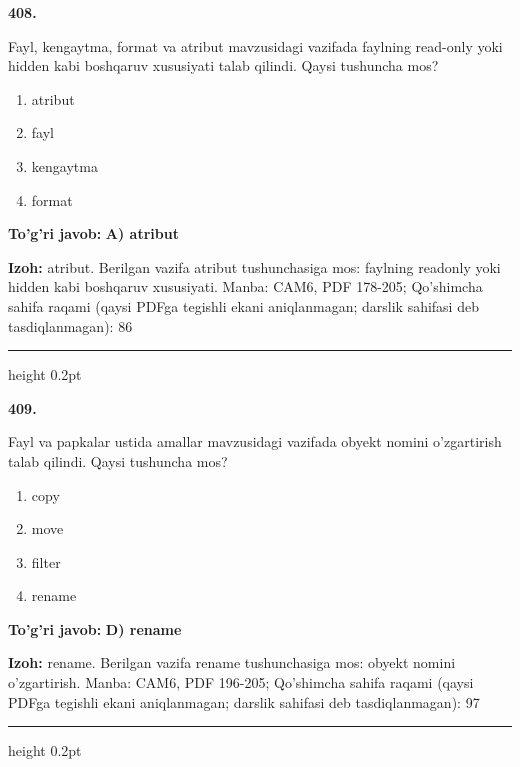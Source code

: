 \documentclass[10pt,a4paper]{article}
\begin{document}
{\bfseries\sffamily\color{ink} 408.}
\par
Fayl, kengaytma, format va atribut mavzusidagi vazifada faylning read-only yoki hidden kabi boshqaruv xususiyati talab qilindi. Qaysi tushuncha mos?
\begin{enumerate}[label=\Alph*),leftmargin=9mm]
\item atribut
\item fayl
\item kengaytma
\item format
\end{enumerate}
\begin{tcolorbox}[enhanced,breakable,colback=teal!4,colframe=teal!60!black,boxrule=0.45pt,arc=1.2mm,left=2.7mm,right=2.7mm,top=1.8mm,bottom=1.8mm,before skip=2mm,after skip=2mm]
{\bfseries\sffamily\color{teal}To'g'ri javob:} \textbf{A) atribut}
\par\smallskip
{\bfseries Izoh:} atribut. Berilgan vazifa atribut tushunchasiga mos: faylning readonly yoki hidden kabi boshqaruv xususiyati. Manba: CAM6, PDF 178-205; Qo'shimcha sahifa raqami (qaysi PDFga tegishli ekani aniqlanmagan; darslik sahifasi deb tasdiqlanmagan): 86
\end{tcolorbox}
\vspace{2mm}\hrule height 0.2pt\vspace{3mm}

{\bfseries\sffamily\color{ink} 409.}
\par
Fayl va papkalar ustida amallar mavzusidagi vazifada obyekt nomini o'zgartirish talab qilindi. Qaysi tushuncha mos?
\begin{enumerate}[label=\Alph*),leftmargin=9mm]
\item copy
\item move
\item filter
\item rename
\end{enumerate}
\begin{tcolorbox}[enhanced,breakable,colback=teal!4,colframe=teal!60!black,boxrule=0.45pt,arc=1.2mm,left=2.7mm,right=2.7mm,top=1.8mm,bottom=1.8mm,before skip=2mm,after skip=2mm]
{\bfseries\sffamily\color{teal}To'g'ri javob:} \textbf{D) rename}
\par\smallskip
{\bfseries Izoh:} rename. Berilgan vazifa rename tushunchasiga mos: obyekt nomini o'zgartirish. Manba: CAM6, PDF 196-205; Qo'shimcha sahifa raqami (qaysi PDFga tegishli ekani aniqlanmagan; darslik sahifasi deb tasdiqlanmagan): 97
\end{tcolorbox}
\vspace{2mm}\hrule height 0.2pt\vspace{3mm}
\end{document}
